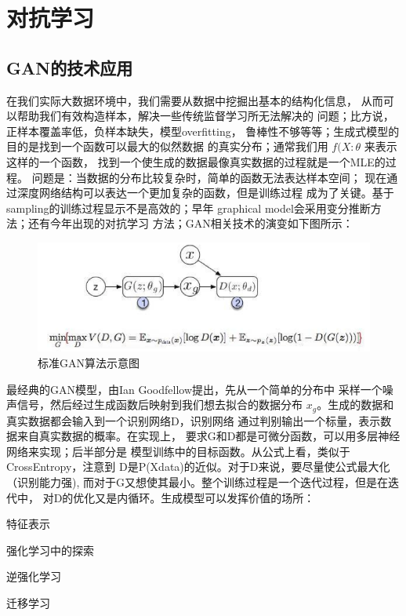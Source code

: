 
\chapter{对抗学习}
\thispagestyle{empty}

\setlength{\fboxrule}{0pt}\setlength{\fboxsep}{0cm}
\noindent\shadowbox{
\begin{tcolorbox}[arc=0mm,colback=lightblue,colframe=darkblue,title=学习目标与要求]

\end{tcolorbox}}
\setlength{\fboxrule}{1pt}\setlength{\fboxsep}{4pt} 


\section{GAN的技术应用} 

在我们实际大数据环境中，我们需要从数据中挖掘出基本的结构化信息，
从而可以帮助我们有效构造样本，解决一些传统监督学习所无法解决的
问题；比方说，正样本覆盖率低，负样本缺失，模型overfitting，
鲁棒性不够等等；生成式模型的目的是找到一个函数可以最大的似然数据
的真实分布；通常我们用 $f(X:\theta$ 来表示这样的一个函数，
找到一个使生成的数据最像真实数据的过程就是一个MLE的过程。
问题是：当数据的分布比较复杂时，简单的函数无法表达样本空间；
现在通过深度网络结构可以表达一个更加复杂的函数，但是训练过程
成为了关键。基于sampling的训练过程显示不是高效的；早年
graphical model会采用变分推断方法；还有今年出现的对抗学习
方法；GAN相关技术的演变如下图所示：


\begin{figure}[h]
\centering
\includegraphics[totalheight=1.8in]{fig/standard_gan.png}
\caption{ 标准GAN算法示意图 } \label{fig:gansamples}
\end{figure}

最经典的GAN模型，由Ian Goodfellow提出，先从一个简单的分布中
采样一个噪声信号，然后经过生成函数后映射到我们想去拟合的数据分布
$x_g$。生成的数据和真实数据都会输入到一个识别网络D，识别网络
通过判别输出一个标量，表示数据来自真实数据的概率。在实现上，
要求G和D都是可微分函数，可以用多层神经网络来实现；后半部分是
模型训练中的目标函数。从公式上看，类似于CrossEntropy，注意到
D是P(Xdata)的近似。对于D来说，要尽量使公式最大化（识别能力强), 
而对于G又想使其最小。整个训练过程是一个迭代过程，但是在迭代中，
对D的优化又是内循环。生成模型可以发挥价值的场所： 
\begin{description}
	\item 特征表示
	\item 强化学习中的探索
	\item 逆强化学习
	\item 迁移学习
\end{description}

